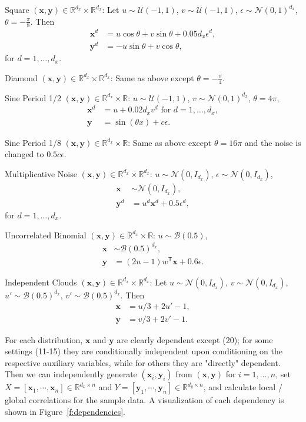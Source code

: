 \documentclass[11pt]{article}
\providecommand{\mb}[1]{\boldsymbol{#1}}
\providecommand{\mc}[1]{\mathcal{#1}}
\newcommand{\Real}{\mathbb{R}}
\newcommand{\T}{^{\ensuremath{\mathsf{T}}}}           %
\newcommand{\mbx}{\ensuremath{\mb{x}}}
\newcommand{\mby}{\ensuremath{\mb{y}}}
\begin{document}
\begin{compactenum}
\item Square $(\mbx,\mby) \in \Real^{d_{x}} \times \Real^{d_{x}}$: Let $u \sim \mc{U}(-1,1)$, $v \sim \mc{U}(-1,1)$, $\epsilon \sim \mc{N}(0,1)^{d_{x}}$, $\theta=-\frac{\pi}{8}$. Then
\begin{align*}
\mbx^{d}&=u \cos\theta + v \sin\theta + 0.05 d_{x}\epsilon^{d},\\
\mby^{d}&=-u \sin\theta + v \cos\theta,
\end{align*}
for $d=1,\ldots,d_{x}$.
\item Diamond $(\mbx,\mby) \in \Real^{d_{x}} \times \Real^{d_{x}}$: Same as above except $\theta=-\frac{\pi}{4}$.
\item Sine Period 1/2 $(\mbx,\mby) \in \Real^{d_{x}} \times \Real$: $u \sim \mc{U}(-1,1)$, $v \sim \mc{N}(0,1)^{d_{x}}$, $\theta=4\pi$,
\begin{align*}
\mbx^{d}&=u+0.02 d_{x} v^{d} \mbox{ for $d=1,\ldots,d_{x}$}, \\
\mby&=\sin ( \theta x )+c\epsilon.
\end{align*}
\item Sine Period 1/8 $(\mbx,\mby) \in \Real^{d_{x}} \times \Real$: Same as above except $\theta=16\pi$ and the noise is changed to $0.5c\epsilon$.
\item Multiplicative Noise $(\mbx,\mby) \in \Real^{d_{x}} \times \Real^{d_{x}}$: $u \sim \mc{N}(0, I_{d_{x}})$, $\epsilon \sim \mc{N}(0, I_{d_{x}})$,
\begin{align*}
\mbx &\sim \mc{N}(0, I_{d_{x}}),\\
\mby^{d}&=u^{d}\mbx^{d}+0.5\epsilon^{d},
\end{align*}
for $d=1,\ldots,d_{x}$.
\item Uncorrelated Binomial $(\mbx,\mby) \in \Real^{d_{x}} \times \Real$: $u \sim \mc{B}(0.5)$,
\begin{align*}
\mbx &\sim \mc{B}(0.5)^{d_{x}},\\
\mby&=(2u-1)w\T \mbx+0.6\epsilon.
\end{align*}
\item Independent Clouds $(\mbx,\mby) \in \Real^{d_{x}} \times \Real^{d_{x}}$: Let $u \sim \mc{N}(0,I_{d_{x}})$, $v \sim \mc{N}(0,I_{d_{x}})$, $u' \sim \mc{B}(0.5)^{d_{x}}$, $v' \sim \mc{B}(0.5)^{d_{x}}$. Then
\begin{align*}
\mbx&=u/3+2u'-1,\\
\mby&=v/3+2v'-1.
\end{align*}
\end{compactenum}

For each distribution, $\mb{x}$ and $\mb{y}$ are clearly dependent except  (20); for some settings (11-15) they are conditionally independent upon conditioning on the respective auxiliary variables, while for others they are "directly" dependent. Then we can independently generate $(\mbx_{i},\mby_{i})$ from $(\mb{x},\mb{y})$ for $i=1,\ldots,n$, set $X=[\mbx_{1},\cdots, \mbx_{n}] \in \Real^{d_{x} \times n}$ and $Y=[\mby_{1},\cdots, \mby_{n}] \in \Real^{d_{y} \times n}$, and calculate local / global correlations for the sample data. A visualization of each dependency is shown in Figure~\ref{f:dependencies}.
\end{document}
